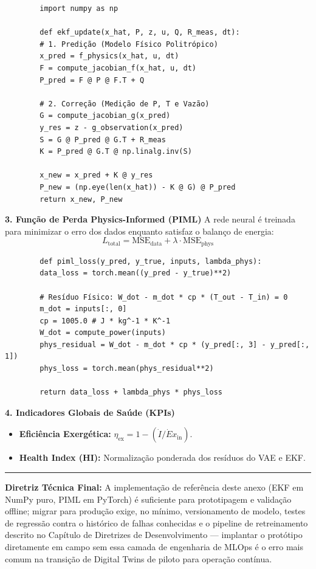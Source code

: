 \documentclass[12pt,a4paper]{article}
\numberwithin{equation}{section}
\numberwithin{table}{section}
\numberwithin{figure}{section}
\begin{document}
	\begin{verbatim}
		import numpy as np
		
		def ekf_update(x_hat, P, z, u, Q, R_meas, dt):
		# 1. Predição (Modelo Físico Politrópico)
		x_pred = f_physics(x_hat, u, dt)
		F = compute_jacobian_f(x_hat, u, dt)
		P_pred = F @ P @ F.T + Q
		
		# 2. Correção (Medição de P, T e Vazão)
		G = compute_jacobian_g(x_pred)
		y_res = z - g_observation(x_pred)
		S = G @ P_pred @ G.T + R_meas
		K = P_pred @ G.T @ np.linalg.inv(S)
		
		x_new = x_pred + K @ y_res
		P_new = (np.eye(len(x_hat)) - K @ G) @ P_pred
		return x_new, P_new
	\end{verbatim}
	
	\textbf{3. Função de Perda Physics-Informed (PIML)}
	A rede neural é treinada para minimizar o erro dos dados enquanto satisfaz o balanço de energia:
	\begin{equation}\label{eq:s26-2}
 L_{\text{total}} = \text{MSE}_{\text{data}} + \lambda \cdotp \text{MSE}_{\text{phys}} 
\end{equation}
	\begin{verbatim}
		def piml_loss(y_pred, y_true, inputs, lambda_phys):
		data_loss = torch.mean((y_pred - y_true)**2)
		
		# Resíduo Físico: W_dot - m_dot * cp * (T_out - T_in) = 0
		m_dot = inputs[:, 0]
		cp = 1005.0 # J * kg^-1 * K^-1
		W_dot = compute_power(inputs) 
		phys_residual = W_dot - m_dot * cp * (y_pred[:, 3] - y_pred[:, 1])
		phys_loss = torch.mean(phys_residual**2)
		
		return data_loss + lambda_phys * phys_loss
	\end{verbatim}
	
	\textbf{4. Indicadores Globais de Saúde (KPIs)}
	\begin{itemize}
		\item \textbf{Eficiência Exergética:} $\eta_{\text{ex}} = 1 - (\dot{I} / \dot{E}x_{\text{in}})$.
		\item \textbf{Health Index (HI):} Normalização ponderada dos resíduos do VAE e EKF.
	\end{itemize}

	\vspace{1em}
	\hrule
	\vspace{1em}

	\textbf{Diretriz Técnica Final:} A implementação de referência deste anexo (EKF em NumPy puro, PIML em PyTorch) é suficiente para prototipagem e validação offline; migrar para produção exige, no mínimo, versionamento de modelo, testes de regressão contra o histórico de falhas conhecidas e o pipeline de retreinamento descrito no Capítulo de Diretrizes de Desenvolvimento — implantar o protótipo diretamente em campo sem essa camada de engenharia de MLOps é o erro mais comum na transição de Digital Twins de piloto para operação contínua.
\end{document}
